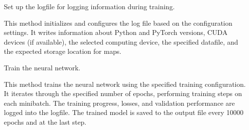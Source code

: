 \documentclass[letterpaper,10pt,english]{sphinxmanual}
\begin{document}
\begin{fulllineitems}
\begin{fulllineitems}
\begin{description}
\begin{itemize}
\begin{description}
\begin{itemize}
\end{itemize}

\end{description}

\end{itemize}

\end{description}

\end{fulllineitems}


\begin{fulllineitems}
\label{\detokenize{MainTrainer:MainTrainer.MainTrainer.setup_logfile}}
\pysigstartsignatures
{}
\pysigstopsignatures
\sphinxAtStartPar
Set up the logfile for logging information during training.
\begin{description}
\sphinxAtStartPar
This method initializes and configures the log file based on the configuration settings.
It writes information about Python and PyTorch versions, CUDA devices (if available),
the selected computing device, the specified datafile, and the expected storage location for maps.

\end{description}

\end{fulllineitems}


\begin{fulllineitems}
\label{\detokenize{MainTrainer:MainTrainer.MainTrainer.train_network}}
\pysigstartsignatures
{}
\pysigstopsignatures
\sphinxAtStartPar
Train the neural network.
\begin{description}
\sphinxAtStartPar
This method trains the neural network using the specified training configuration.
It iterates through the specified number of epochs, performing training steps on each minibatch.
The training progress, losses, and validation performance are logged into the logfile.
The trained model is saved to the output file every 10000 epochs and at the last step.

\end{description}

\end{fulllineitems}


\end{fulllineitems}
\end{document}
